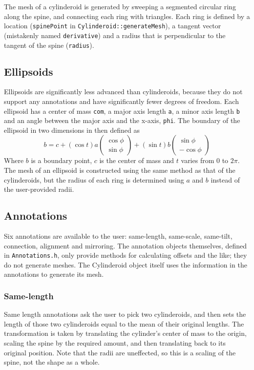 The mesh of a cylinderoid is generated by sweeping a segmented circular ring
along the spine, and connecting each ring with triangles. Each ring is defined
by a location (\verb#spinePoint# in \verb#Cylinderoid::generateMesh#), a tangent
vector (mistakenly named \verb#derivative#) and a radius that is perpendicular
to the tangent of the spine (\verb#radius#).

\subsection{Ellipsoids}
Ellipsoids are significantly less advanced than cylinderoids, because they do
not support any annotations and have significantly fewer degrees of freedom.
Each ellipsoid has a center of mass \verb#com#, a major axis length \verb#a#, a
minor axis length \verb#b# and an angle between the major axis and the x-axis,
\verb#phi#. The boundary of the ellipsoid in two dimensions in then defined as
\begin{equation*}
b = c + (\cos t) a 
	\left(\begin{smallmatrix}\cos \phi\\ \sin \phi\end{smallmatrix} \right)
	+ (\sin t) b
	\left(\begin{smallmatrix}\sin \phi\\ -\cos \phi\end{smallmatrix} \right)
\end{equation*}
Where $b$ is a boundary point, $c$ is the center of mass and $t$ varies from 0
to $2\pi$. The mesh of an ellipsoid is constructed using the same method as that
of the cylinderoids, but the radius of each ring is determined using $a$ and $b$
instead of the user-provided radii.

\subsection{Annotations}
Six annotations are available to the user: same-length, same-scale, same-tilt,
connection, alignment and mirroring. The annotation objects themselves, defined
in \verb#Annotations.h#, only provide methods for calculating offsets and the
like; they do not generate meshes. The Cylinderoid object itself uses the
information in the annotations to generate its mesh.

\subsubsection{Same-length}
Same length annotations ask the user to pick two cylinderoids, and then sets the
length of those two cylinderoids equal to the mean of their original lengths.
The transformation is taken by translating the cylinder's center of mass to the
origin, scaling the spine by the required amount, and then translating back to
its original position. Note that the radii are uneffected, so this is a scaling
of the spine, not the shape as a whole.

